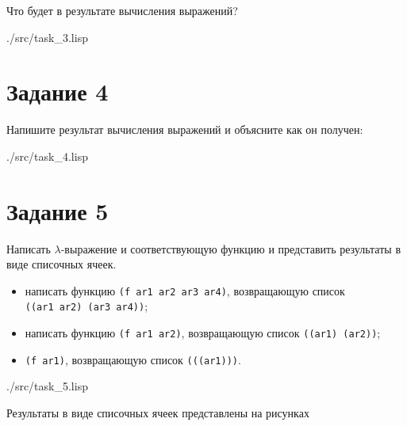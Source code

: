 Что будет в результате вычисления выражений?
\clearpage
\begin{lstinputlisting}[
	caption={Задание 3},
	label={lst:t3},
	style={lsp},
	]{./src/task_3.lisp}
\end{lstinputlisting}

\section*{Задание 4}
Напишите результат вычисления выражений и объясните как он получен:
\begin{lstinputlisting}[
	caption={Задание 4},
	label={lst:t4},
	style={lsp},
	]{./src/task_4.lisp}
\end{lstinputlisting}

\section*{Задание 5}

Написать $\lambda$-выражение и соответствующую функцию и представить результаты в виде списочных ячеек.

\begin{itemize}[label=---]
	\item написать функцию {\texttt{(f ar1 ar2 ar3 ar4)}}, возвращающую список \\{\texttt{((ar1 ar2) (ar3 ar4))}};
	\item написать функцию {\texttt{(f ar1 ar2)}}, возвращающую список {\texttt{((ar1) (ar2))}};
	\item {\texttt{(f ar1)}}, возвращающую список {\texttt{(((ar1)))}}.
\end{itemize}


\begin{lstinputlisting}[
	caption={Задание 5},
	label={lst:t5},
	style={lsp},
	]{./src/task_5.lisp}
\end{lstinputlisting}

Результаты в виде списочных ячеек представлены на рисунках 

